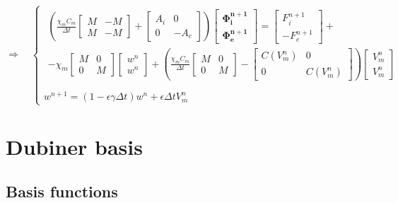 \documentclass[a4paper]{article}
\begin{document}
\begin{equation}
\Rightarrow \quad 
\begin{cases}
\begin{gathered}
\left(
	\frac{\chi_m C_m}{\Delta t} \begin{bmatrix}M & -M \\ M & -M\end{bmatrix}
	+ \begin{bmatrix} A_i & 0 \\ 0 & -A_e \end{bmatrix}
	\right) \begin{bmatrix} \bm{\Phi_i^{n+1}} \\ \bm{\Phi_e^{n+1}}  \end{bmatrix} =
	\begin{bmatrix} F_i^{n+1} \\ -F_e^{n+1} \end{bmatrix} + \\ -
	\chi_m\begin{bmatrix} M & 0 \\ 0 & M \end{bmatrix} \begin{bmatrix} w^n \\ w^n \end{bmatrix} +
	\left(\frac{\chi_mC_m}{\Delta t}\begin{bmatrix} M & 0 \\ 0 & M \end{bmatrix}
	- \begin{bmatrix} C(V_m^n) & 0 \\ 0 & C(V_m^n)\end{bmatrix} 
	\right) \begin{bmatrix} V_m^n \\ V_m^n \end {bmatrix}
	 \end{gathered} \\ \\
	w^{n+1} = (1-\epsilon \gamma \Delta t) w^n + \epsilon \Delta tV_m^n
\end{cases}
\end{equation}





\newpage
\section{Dubiner basis} 
\vspace{5mm}
\subsection{Basis functions}
\vspace{4mm}
\end{document}
